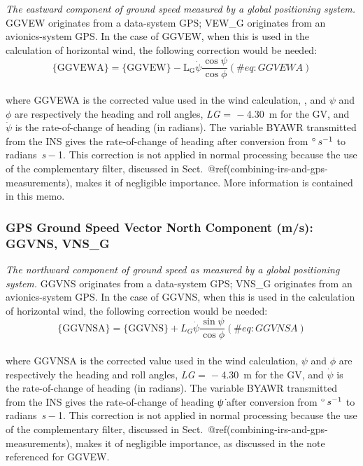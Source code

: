 \documentclass[
  english,
]{book}
\begin{document}
\emph{The eastward component of ground speed measured by a global
positioning system.} GGVEW originates from a data-system GPS; VEW\_G
originates from an avionics-system GPS. In the case of GGVEW, when this
is used in the calculation of horizontal wind, the following correction
would be needed: \begin{equation}
\mathrm{\{GGVEWA\}}=\mathrm{\{GGVEW\}-L_G}\dot{\psi}\frac{\cos\psi}{\cos\phi}
(\#eq:GGVEWA)
\end{equation}\\
where GGVEWA is the corrected value used in the wind calculation, , and
\(\psi\) and \(\phi\) are respectively the heading and roll angles,
{\emph{L}\emph{G} =  − 4.30}~m for the GV, and \(\dot{\psi}\) is the
rate-of-change of heading (in radians). The variable BYAWR transmitted
from the INS gives the rate-of-change of heading after conversion from
{\(^{\circ}\thinspace s^{-1}\)} to radians~{\emph{s} − 1}. This
correction is not applied in normal processing because the use of the
complementary filter, discussed in
Sect.~@ref(combining-irs-and-gps-measurements), makes it of negligible
importance. More information is contained in this memo.

\hypertarget{ggvns}{%
\subsubsection*{GPS Ground Speed Vector North Component (m/s): GGVNS,
VNS\_G}\label{ggvns}}

\emph{The northward component of ground speed as measured by a global
positioning system.} GGVNS originates from a data-system GPS; VNS\_G
originates from an avionics-system GPS. In the case of GGVNS, when this
is used in the calculation of horizontal wind, the following correction
would be needed: \begin{equation}
\mathrm{\{GGVNSA\}} = \mathrm{\{GGVNS\}}+L_{G}\dot{\psi}\frac{\sin\psi}{\cos\phi}
(\#eq:GGVNSA)
\end{equation}\\
where GGVNSA is the corrected value used in the wind calculation,
\(\psi\) and \(\phi\) are respectively the heading and roll angles,
{\emph{L}\emph{G} =  − 4.30}~m for the GV, and \(\dot{\psi}\) is the
rate-of-change of heading (in radians). The variable BYAWR transmitted
from the INS gives the rate-of-change of heading {\emph{ψ̇}} after
conversion from {\(^{\circ}\thinspace s^{-1}\)} to
radians~{\emph{s} − 1}. This correction is not applied in normal
processing because the use of the complementary filter, discussed in
Sect.~@ref(combining-irs-and-gps-measurements), makes it of negligible
importance, as discussed in the note referenced for GGVEW.
\end{document}
